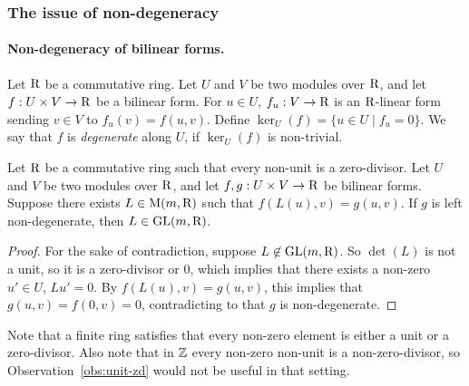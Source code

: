 \subsubsection{The issue of non-degeneracy}\label{subsec:nondeg}

\paragraph{Non-degeneracy of bilinear forms.}
Let $\mathrm{R}$ be a commutative ring. 
Let $U$ and $V$ be two modules over $\mathrm{R}$, and let $f:U\times V\to \mathrm{R}$ be a bilinear form. For $u\in U$, $f_u:V\to \mathrm{R}$ is an $\mathrm{R}$-linear form sending $v\in V$ to $f_u(v)=f(u, v)$. Define $\ker_U(f)=\{u\in U\mid f_u=0\}$. We say that $f$ is \emph{degenerate} along $U$, if $\ker_U(f)$ is non-trivial.
\begin{observation}\label{obs:unit-zd}
	Let $\mathrm{R}$ be a commutative ring such that every non-unit is a zero-divisor. Let $U$ and $V$ be two modules over $\mathrm{R}$, and let $f, g:U\times V\to \mathrm{R}$ be bilinear forms. Suppose there exists $L\in\mathrm{M}(m, \mathrm{R})$ such that $f(L(u), v)=g(u, v)$. If $g$ is left non-degenerate, then $L\in\mathrm{GL}(m, \mathrm{R})$. 
\end{observation}
\begin{proof}
	For the sake of contradiction, suppose $L\not\in\mathrm{GL}(m, \mathrm{R})$. So $\det(L)$ is not a unit, so it is a zero-divisor or 0, which implies that there exists a non-zero $u'\in U$, $Lu'=0$. By $f(L(u), v)=g(u, v)$, this implies that $g(u, v)=f(0, v)=0$, contradicting to that $g$ is non-degenerate.
\end{proof}
Note that a finite ring satisfies that every non-zero element is either a unit or a zero-divisor. Also note that in $\mathbb{Z}$ every non-zero non-unit is a non-zero-divisor, so Observation~\ref{obs:unit-zd} would not be useful in that setting.

